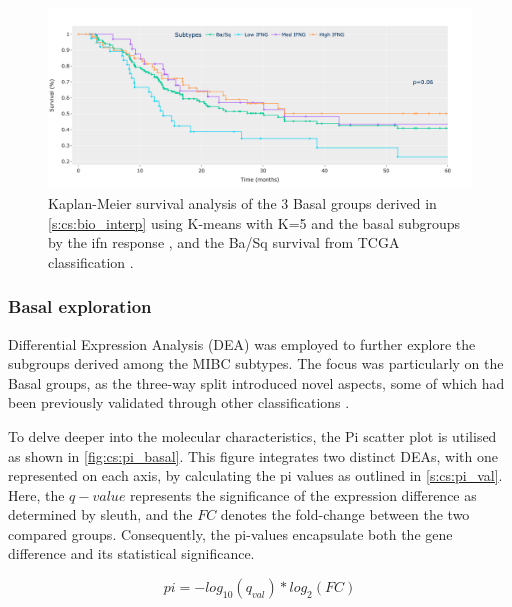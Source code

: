 \begin{figure}[!htb]    
    \centering
    \includegraphics[width=1.0\textwidth,keepaspectratio]{Sections/ClusteringAnalysis/Resources/discussion/survival_basal.png}
    \caption{Kaplan-Meier survival analysis of the 3 Basal groups derived in \cref{s:cs:bio_interp} using K-means with K=5 and the basal subgroups by the \acrshort{ifn} response \citet{Baker2022-bj}, and the Ba/Sq survival from TCGA classification \citet{Robertson2017-mg}.}
    \label{fig:cs:basal_survival}
\end{figure}

\subsubsection{Basal exploration} \label{s:cs:basal_interp}

Differential Expression Analysis (DEA) was employed to further explore the subgroups derived among the MIBC subtypes. The focus was particularly on the Basal groups, as the three-way split introduced novel aspects, some of which had been previously validated through other classifications \citet{Baker2022-bj,Marzouka2018-ge}.

To delve deeper into the molecular characteristics, the Pi scatter plot is utilised as shown in \cref{fig:cs:pi_basal}. This figure integrates two distinct DEAs, with one represented on each axis, by calculating the pi values as outlined in \cref{s:cs:pi_val}. Here, the $q-value$ represents the significance of the expression difference as determined by sleuth, and the $FC$ denotes the fold-change between the two compared groups. Consequently, the pi-values encapsulate both the gene difference and its statistical significance.


\begin{equation} \label{s:cs:pi_val}
    pi = - log_{10}(q_{val}) * log_{2}(FC)
\end{equation} 

